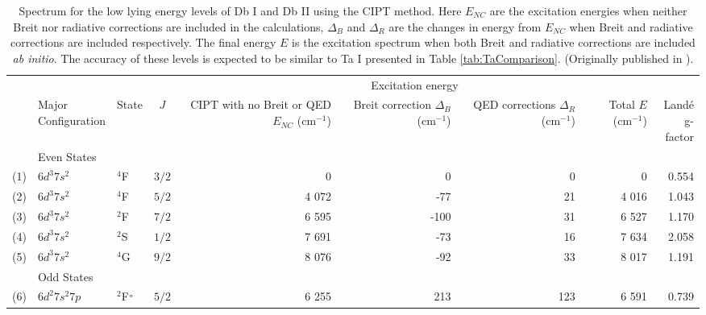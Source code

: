 \documentclass[8pt,a4paper, twoside]{report}
\begin{document}
\begin{table}[p!]
\begin{adjustwidth}{-1.3cm}{-1.3cm}
\center 
\caption{Spectrum for the low lying energy levels of Db I and Db II using the CIPT method. Here $E_{NC}$ are the excitation energies when neither Breit nor radiative corrections are included in the calculations, $\Delta_B$ and $\Delta_R$ are the changes in energy from $E_{NC}$ when Breit and radiative corrections are included respectively. The final energy $E$ is the excitation spectrum when both Breit and radiative corrections are included \textit{ab initio}. The accuracy of these levels is expected to be similar to Ta I presented in Table \ref{tab:TaComparison}. (Originally published in \cite{LDFDb2018}). \label{table:DbISpectrum}} 
\begin{tabular}{cllcrrrrr}
\toprule
\toprule
  & & & & \multicolumn{4}{c}{Excitation energy} &\\
  \cmidrule{5-8}
& \parbox{2cm}{Major \\ Configuration} & State & $J$ & \parbox{2cm}{CIPT with \\ no Breit or QED \\ $E_{NC}$ \\ (cm$^{-1}$)} & \parbox{2cm}{Breit \\ correction \\ $\Delta_B$ \\ (cm$^{-1}$)} & \parbox{2cm}{QED \\ corrections \\$\Delta_R$\\ (cm$^{-1}$)} &  \parbox{2cm}{Total\\ $E$ \\ (cm$^{-1}$)} & \parbox{1.5cm}{Land\'{e} \\g-factor} \\ 
\midrule
& Even States \\
(1)  &   $6d^3 7s^2$  &  $^4$F  &  $3/2$ & 0 & 0 & 0 & 0 & 0.554 \\ 
(2) &   $6d^3 7s^2$  &  $^4$F &  $5/2$  &  4 072 & -77 & 21 & 4 016 & 1.043 \\ 
(3)  &  $6d^3 7s^2$  &  $^2$F &  $7/2$  &  6 595 & -100 & 31 & 6 527 & 1.170 \\ 
(4)  &  $6d^3 7s^2$  &  $^2$S  & $1/2$ &  7 691 &  -73  &  16 & 7 634 & 2.058 \\ 
(5)  &  $6d^3 7s^2$  &  $^4$G &  $9/2$ &  8 076 & -92 &  33 & 8 017 & 1.191 \\ 
&  Odd States \\
(6) & $6d^2 7s^2 7p$  &  $^2$F$^{\rm_o}$  & $5/2$ &  6 255 & 213 &  123 & 6 591 & 0.739 \\ 

\end{tabular}
\end{adjustwidth}
\end{table}
\end{document}
